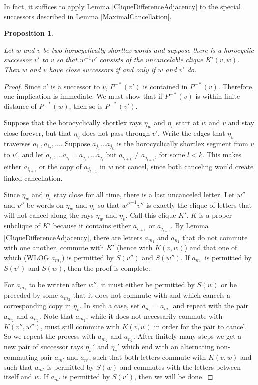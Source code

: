 \documentclass{amsart}
\newtheorem{proposition}[theorem]{Proposition}
\theoremstyle{definition}
\theoremstyle{remark}
\begin{document}
	In fact, it suffices to apply Lemma \ref{CliqueDifferenceAdjacency} to the special successors described in Lemma \ref{MaximalCancellation}.
	
	\begin{proposition}\label{DivergenceEdgeCriterion}
		
		Let $w$ and $v$ be two horocyclically shortlex words and suppose there is a horocyclic successor $v'$ to $v$ so that $w^{-1}v'$ consists of the uncancelable clique $K'(v,w)$. Then $w$ and $v$ have close successors if and only if $w$ and $v'$ do.
		
	\end{proposition}
	
	\begin{proof}
		
		Since $v'$ is a successor to $v$, $P^{-*}(v')$ is contained in $P^{-*}(v)$.  Therefore, one implication is immediate. We must show that if $P^{-*}(v)$ is within finite distance of $P^{-*}(w)$, then so is $P^{-*}(v')$.
		
		Suppose that the horocyclically shortlex rays $\eta_w$ and $\eta_v$ start at $w$ and $v$ and stay close forever, but that $\eta_v$ does not pass through $v'$. Write the edges that $\eta_v$ traverses $a_{i_1},a_{i_2},...$. Suppose $a_{j_1}...a_{j_k}$ is the horocyclically shortlex segment from $v$ to $v'$, and let $a_{i_1}, ... a_{i_l}=a_{j_1}, ... a_{j_l}$ but $a_{i_{l+1}}\ne a_{j_{l+1}}$, for some $l<k$. This makes either $a_{i_{l+1}}$ or the copy of $a_{j_{l+1}}$ in $w$ not cancel, since both canceling would create linked cancellation.
		
		Since $\eta_w$ and $\eta_v$ stay close for all time, there is a last uncanceled letter. Let $w''$ and $v''$ be words on $\eta_w$ and $\eta_v$ so that $w''^{-1}v''$ is exactly the clique of letters that will not cancel along the rays $\eta_w$ and $\eta_v$. Call this clique $K'$. $K$ is a proper subclique of $K'$ because it contains either $a_{i_{l+1}}$ or $a_{j_{l+1}}$. By Lemma \ref{CliqueDifferenceAdjacency}, there are letters $a_{m_1}$ and $a_{n_1}$ that do not commute with one another, commute with $K'$ (hence with $K(v,w)$) and that one of which (WLOG $a_{m_1}$) is permitted by $S(v'')$ and $S(w'')$. If $a_{m_1}$ is permitted by $S(v')$ and $S(w)$, then the proof is complete.
		
		For $a_{m_1}$ to be written after $w''$, it must either be permitted by $S(w)$ or be preceded by some $a_{m_2}$ that it does not commute with and which cancels a corresponding copy in $\eta_v$. In such a case, set $a_{n_2}=a_{m_1}$ and repeat with the pair $a_{m_2}$ and $a_{n_2}$. Note that $a_{m_2}$, while it does not necessarily commute with $K(v'',w'')$, must still commute with $K(v,w)$ in order for the pair to cancel. So we repeat the process with $a_{m_2}$ and $a_{n_2}$. After finitely many steps we get a new pair of successor rays $\eta_w'$ and $\eta_v'$ which end with an alternating non-commuting pair $a_{m'}$ and $a_{n'}$, such that both letters commute with $K(v,w)$ and such that $a_{m'}$ is permitted by $S(w)$ and commutes with the letters between itself and $w$. If $a_{m'}$ is permitted by $S(v')$, then we will be done.
		

\end{proof}
\end{document}
